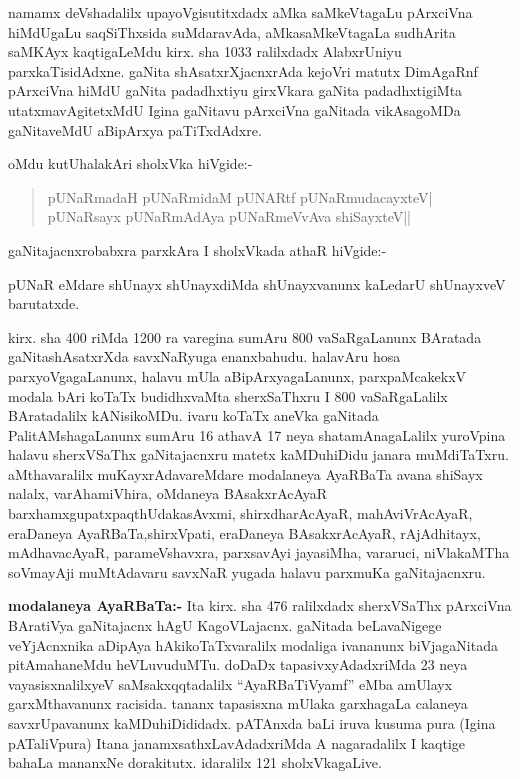 namamx deVshadalilx upayoVgisutitxdadx aMka saMkeVtagaLu pArxciVna hiMdUgaLu saqSiThx\-sida suMdaravAda, aMkasaMkeVtagaLa sudhArita saMKAyx kaqtigaLeMdu kirx. sha {\rm 1033} ralilxdadx AlabxrUniyu parxkaTisidAdxne. gaNita shAsatxrXjacnxrAda kejoVri matutx DimAgaRnf pArxciVna hiMdU gaNita padadhxtiyu girxVkara gaNita padadhxtigiMta utatxmavAgitetxMdU Igina gaNitavu pArxciVna gaNitada vikAsagoMDa gaNitaveMdU aBipArxya paTiTxdAdxre.

oMdu kutUhalakAri sholxVka hiVgide:-
\begin{verse}
pUNaRmadaH pUNaRmidaM pUNARtf pUNaRmudacayxteV|\\
pUNaRsayx pUNaRmAdAya pUNaRmeVvAva shiSayxteV||
\end{verse}

gaNitajacnxrobabxra parxkAra I sholxVkada athaR hiVgide:-

pUNaR eMdare shUnayx shUnayxdiMda shUnayxvanunx kaLedarU shUnayxveV barutatxde.

kirx. sha {\rm 400} riMda {\rm 1200} ra varegina sumAru {\rm 800} vaSaRgaLanunx BAratada gaNita\-shAsatxrXda savxNaRyuga enanxbahudu. halavAru hosa parxyoVgagaLanunx, halavu mUla aBipArxyagaLanunx, parxpaMcakekxV modala bAri koTaTx budidhxvaMta sherxSaThxru I {\rm 800} vaSaRgaLalilx BAratadalilx kANisikoMDu. ivaru koTaTx aneVka gaNitada PalitAMshagaLanunx sumAru {\rm 16} athavA {\rm 17} neya shatamAnagaLalilx yuroVpina halavu sherxVSaThx gaNita\-jacnxru matetx kaMDuhiDidu janara muMdiTaTxru. aMthavaralilx muKayxrAdavareMdare modalaneya AyaRBaTa avana shiSayx nalalx, varAhamiVhira, oMdaneya BAsakxrAcAyaR barxhamxgupatx\break paqthUdakasAvxmi, shirxdharAcAyaR, mahAviVrAcAyaR, eraDaneya AyaRBaTa,\break shirxVpati, eraDaneya BAsakxrAcAyaR, rAjAdhitayx, mAdhavacAyaR, parameVshavxra, parxsa\-vAyi jayasiMha, vararuci, niVlakaMTha soVmayAji muMtAdavaru savxNaR yugada halavu parxmuKa gaNitajacnxru.

\textbf{modalaneya AyaRBaTa:-} Ita kirx. sha {\rm 476} ralilxdadx sherxVSaThx pArxciVna BAratiVya gaNitajacnx hAgU KagoVLajacnx. gaNitada beLavaNigege veYjAcnxnika aDipAya hAkikoTaTxvaralilx modaliga ivananunx biVjagaNitada pitAmahaneMdu heVLuvuduMTu. doDaDx tapasivxyAdadxriMda {\rm 23} neya vayasisxnalilxyeV saMsakxqqtadalilx ``AyaRBaTiVyamf'' eMba amUlayx garxMthavanunx racisida. tananx tapasisxna mUlaka garxhagaLa calaneya savxrUpavanunx kaMDuhiDididadx. pATAnxda baLi iruva kusuma pura (Igina pATaliVpura) Itana janamxsathxLavAdadxriMda  A nagaradalilx I kaqtige bahaLa mananxNe dorakitutx. idaralilx {\rm 121} sholxVkagaLive.

